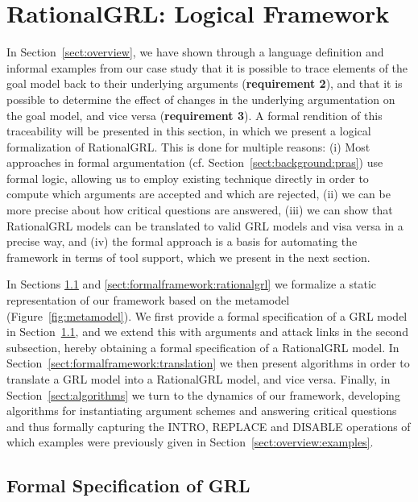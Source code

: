 \section{RationalGRL: Logical Framework}
\label{sect:formalframework}

In Section~\ref{sect:overview}, we have shown through a language definition and informal examples from our case study that it is possible to trace elements of the goal model back to their underlying arguments (\textbf{requirement 2}), and that it is possible to determine the effect of changes in the underlying argumentation on the goal model, and vice versa (\textbf{requirement 3}). A formal rendition of this traceability will be presented in this section, in which we present a logical formalization of RationalGRL. This is done for multiple reasons: (i) Most approaches in formal argumentation (cf. Section~\ref{sect:background:pras}) use formal logic, allowing us to employ existing technique directly in order to compute which arguments are accepted and which are rejected, (ii) we can be more precise about how critical questions are answered, (iii) we can show that RationalGRL models can be translated to valid GRL models and visa versa in a precise way, and (iv) the formal approach is a basis for automating the framework in terms of tool support, which we present in the next section.

In Sections \ref{sect:formalframework:grl} and \ref{sect:formalframework:rationalgrl} we formalize a static representation of our framework based on the metamodel (Figure~\ref{fig:metamodel}). We first provide a formal specification of a GRL model in Section~\ref{sect:formalframework:grl}, and we extend this with arguments and attack links in the second subsection, hereby obtaining a formal specification of a RationalGRL model. In Section~\ref{sect:formalframework:translation} we then present algorithms in order to translate a GRL model into a RationalGRL model, and vice versa. Finally, in Section~\ref{sect:algorithms} we turn to the dynamics of our framework, developing algorithms for instantiating argument schemes and answering critical questions and thus formally capturing the \textsf{INTRO}, \textsf{REPLACE} and \textsf{DISABLE} operations of which examples were previously given in Section~\ref{sect:overview:examples}. 

\subsection{Formal Specification of GRL}
\label{sect:formalframework:grl}

